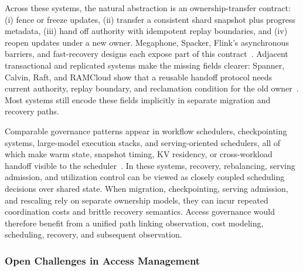\documentclass[manuscript,nonacm]{acmart}
\begin{document}
Across these systems, the natural abstraction is an ownership-transfer contract: (i) fence or freeze updates, (ii) transfer a consistent shard snapshot plus progress metadata, (iii) hand off authority with idempotent replay boundaries, and (iv) reopen updates under a new owner. Megaphone, Spacker, Flink's asynchronous barriers, and fast-recovery designs each expose part of this contract~\cite{nasir2019megaphone,mao2025spacker,carbone2015asynchronous,zhao2024recovery}. Adjacent transactional and replicated systems make the missing fields clearer: Spanner, Calvin, Raft, and RAMCloud show that a reusable handoff protocol needs current authority, replay boundary, and reclamation condition for the old owner~\cite{corbett2012spanner,thomson2012calvin,ongaro2014raft,ousterhout2011ramcloud}. Most systems still encode these fields implicitly in separate migration and recovery paths.

Comparable governance patterns appear in workflow schedulers, checkpointing systems, large-model execution stacks, and serving-oriented schedulers, all of which make warm state, snapshot timing, KV residency, or cross-workload handoff visible to the scheduler~\cite{mahgoub2021sonic,mahgoub2022orion,zhao2025rtsfaas,wan2025bytecheckpoint,huang2025flowcheck,lian2025universal,lin2025weipipe,liu2025mario,hong2025sola,oh2024exegpt,wang2025sirius}. In these systems, recovery, rebalancing, serving admission, and utilization control can be viewed as closely coupled scheduling decisions over shared state. When migration, checkpointing, serving admission, and rescaling rely on separate ownership models, they can incur repeated coordination costs and brittle recovery semantics. Access governance would therefore benefit from a unified path linking observation, cost modeling, scheduling, recovery, and subsequent observation.



\subsubsection{Open Challenges in Access Management}
\end{document}
